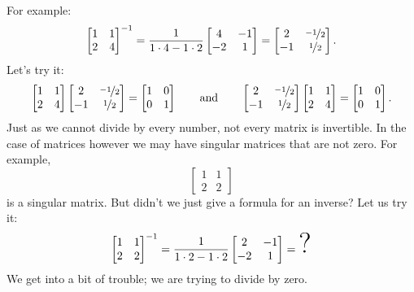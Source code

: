 For example:
\begin{equation*}
\begin{bmatrix}
1 & 1 \\
2 & 4
\end{bmatrix}^{-1}
=
\frac{1}{1\cdot 4-1 \cdot 2}
\begin{bmatrix}
4 & -1 \\
-2 & 1
\end{bmatrix}
=
\begin{bmatrix}
2 & \nicefrac{-1}{2} \\
-1 & \nicefrac{1}{2}
\end{bmatrix} .
\end{equation*}
Let's try it:
\begin{equation*}
\begin{bmatrix}
1 & 1 \\
2 & 4
\end{bmatrix}
\begin{bmatrix}
2 & \nicefrac{-1}{2} \\
-1 & \nicefrac{1}{2}
\end{bmatrix}
=
\begin{bmatrix}
1 & 0 \\
0 & 1
\end{bmatrix}
\qquad
\text{and}
\qquad
\begin{bmatrix}
2 & \nicefrac{-1}{2} \\
-1 & \nicefrac{1}{2}
\end{bmatrix}
\begin{bmatrix}
1 & 1 \\
2 & 4
\end{bmatrix}
=
\begin{bmatrix}
1 & 0 \\
0 & 1
\end{bmatrix} .
\end{equation*}
Just as we cannot divide by every number, not every matrix is
invertible.  In the case of matrices however we may have singular
matrices that are not zero.  For example,
\begin{equation*}
\begin{bmatrix}
1 & 1 \\
2 & 2
\end{bmatrix}
\end{equation*}
is a singular matrix.  But didn't we just give a formula for an inverse?
Let us try it:
\begin{equation*}
\begin{bmatrix}
1 & 1 \\
2 & 2
\end{bmatrix}^{-1}
=
\frac{1}{1\cdot 2-1 \cdot 2}
\begin{bmatrix}
2 & -1 \\
-2 & 1
\end{bmatrix}
=
\text{\Huge ?}
\end{equation*}
We get into a bit of trouble; we are trying to divide by zero.

